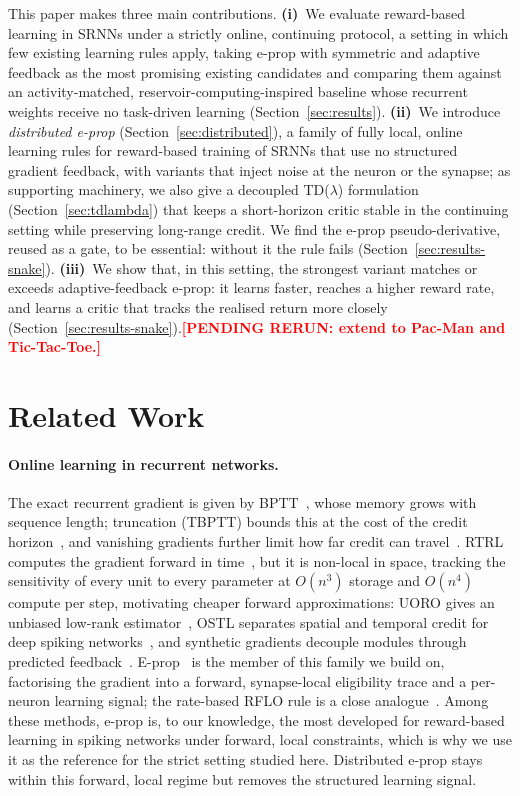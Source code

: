 \documentclass[10pt,twocolumn]{article}
\newcommand{\pending}[1]{\textcolor{red}{\bfseries[PENDING RERUN#1]}}
\begin{document}
This paper makes three main contributions. \textbf{(i)}~We evaluate
reward-based learning in SRNNs under a strictly online, continuing protocol, a
setting in which few existing learning rules apply, taking e-prop with
symmetric and adaptive feedback as the most promising existing candidates and
comparing them against an activity-matched, reservoir-computing-inspired
baseline whose recurrent weights receive no task-driven learning
(Section~\ref{sec:results}). \textbf{(ii)}~We introduce \emph{distributed
e-prop} (Section~\ref{sec:distributed}), a family of fully local, online
learning rules for reward-based training of SRNNs that use no structured
gradient feedback, with variants that inject noise at the neuron or the
synapse; as supporting machinery, we also give a decoupled TD($\lambda$)
formulation (Section~\ref{sec:tdlambda}) that keeps a short-horizon critic
stable in the continuing setting while preserving long-range credit. We find
the e-prop pseudo-derivative, reused as a gate, to be essential: without it
the rule fails (Section~\ref{sec:results-snake}). \textbf{(iii)}~We show that,
in this setting, the strongest variant matches or exceeds adaptive-feedback
e-prop: it learns faster, reaches a higher reward rate, and learns a critic
that tracks the realised return more closely
(Section~\ref{sec:results-snake}).\pending{: extend to Pac-Man and
Tic-Tac-Toe.}


\section{Related Work}
\label{sec:related}

\paragraph{Online learning in recurrent networks.}
The exact recurrent gradient is given by BPTT~\citep{Werbos1990BackpropagationTT},
whose memory grows with sequence length; truncation (TBPTT) bounds this at the
cost of the credit horizon~\citep{WilliamsZipser1995}, and vanishing gradients
further limit how far credit can travel~\citep{learningLongTermHard}. RTRL
computes the gradient forward in time~\citep{RTRL}, but it is non-local in
space, tracking the sensitivity of every unit to every parameter at $O(n^3)$
storage and $O(n^4)$ compute per step,
motivating cheaper forward approximations: UORO gives an unbiased low-rank
estimator~\citep{UORO}, OSTL separates spatial and temporal credit for deep
spiking networks~\citep{OSTL}, and synthetic gradients decouple modules through
predicted feedback~\citep{Jaderberg2016}. E-prop~\citep{eprop2020} is the member
of this family we build on, factorising the gradient into a forward,
synapse-local eligibility trace and a per-neuron learning signal; the rate-based
RFLO rule is a close analogue~\citep{murray2019local}. Among these methods,
e-prop is, to our knowledge, the most developed for reward-based learning in
spiking networks under forward, local constraints, which is why we use it as
the reference for the strict setting studied here. Distributed e-prop stays
within this forward, local regime but removes the structured learning signal.
\end{document}
